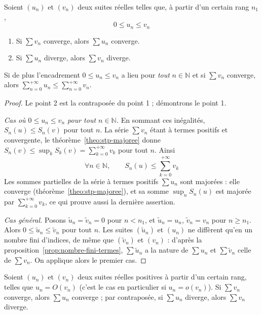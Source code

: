 \begin{theo}
\label{theo:regle-comparaison}
Soient $(u_n)$ et $(v_n)$ deux suites réelles telles que, à partir d'un certain rang $n_1$,
\[0\leq u_n\leq v_n\]
\begin{enumerate}
\item Si $\sum v_n$ converge, alors $\sum u_n$ converge.
\item Si $\sum u_n$ diverge, alors $\sum v_n$ diverge.
\end{enumerate}
Si de plus l'encadrement $0\leq u_n\leq v_n$ a lieu pour \emph{tout} $n\in\mathbb{N}$ et si $\sum v_n$ converge, alors $\displaystyle\sum_{n=0}^{+\infty}u_n\leq\sum_{n=0}^{+\infty}v_n$.
\end{theo}

\begin{proof}
Le point 2 est la contraposée du point 1 ; démontrons le point 1.

\emph{Cas où $0\leq u_n\leq v_n$ pour tout $n\in\mathbb{N}$.} En sommant ces inégalités, $S_n(u)\leq S_n(v)$ pour tout $n$. La série $\sum v_n$ étant à termes positifs et convergente, le théorème~\ref{theo:stp-majoree} donne $S_n(v)\leq\sup_kS_k(v)=\sum_{k=0}^{+\infty}v_k$ pour tout $n$. Ainsi
\[\forall n\in\mathbb{N},\qquad S_n(u)\leq\sum_{k=0}^{+\infty}v_k\]
Les sommes partielles de la série à termes positifs $\sum u_n$ sont majorées : elle converge (théorème~\ref{theo:stp-majoree}), et sa somme $\sup_nS_n(u)$ est majorée par $\sum_{k=0}^{+\infty}v_k$, ce qui prouve aussi la dernière assertion.

\emph{Cas général.} Posons $\tilde u_n=\tilde v_n=0$ pour $n<n_1$, et $\tilde u_n=u_n$, $\tilde v_n=v_n$ pour $n\geq n_1$. Alors $0\leq\tilde u_n\leq\tilde v_n$ pour tout $n$. Les suites $(\tilde u_n)$ et $(u_n)$ ne diffèrent qu'en un nombre fini d'indices, de même que $(\tilde v_n)$ et $(v_n)$ : d'après la proposition~\ref{prop:nombre-fini-termes}, $\sum\tilde u_n$ a la nature de $\sum u_n$ et $\sum\tilde v_n$ celle de $\sum v_n$. On applique alors le premier cas.
\end{proof}

\begin{coro}
\label{coro:regle-domination}
Soient $(u_n)$ et $(v_n)$ deux suites réelles positives à partir d'un certain rang, telles que $u_n=O(v_n)$ (c'est le cas en particulier si $u_n=o(v_n)$). Si $\sum v_n$ converge, alors $\sum u_n$ converge ; par contraposée, si $\sum u_n$ diverge, alors $\sum v_n$ diverge.
\end{coro}

